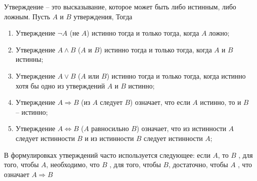     Утверждение -- это высказывание, которое может быть 
    либо истинным, либо ложным. Пусть $A$ и $B$ утверждения, Тогда

    \begin{enumerate}
        \item Утверждение $\lnot A$ (не $A$) истинно тогда и 
        только тогда, когда $A$ ложно;
        \item Утверждение $A \land B$ ($A$ и $B$) истинно 
        тогда и только тогда, когда $A$ и $B$ истинны;
        \item Утверждение $A \lor B$ ($A$ или $B$) истинно 
        тогда и только тогда, когда истинно хотя бы одно из утверждений
        $A$ и $B$ истинно;
        \item Утверждение $A \Rightarrow B$ (из $A$ следует $B$) означает,
        что если $A$ истинно, то и $B$ -- истинно;
        \item Утверждение $A \Leftrightarrow B$ ($A$ равносильно $B$) означает,
        что из истинности $A$ следует истинности $B$ и из истинности $B$
        следует истинности $A$;
    \end{enumerate}

    В формулировках утверждений часто используется следующее: \glqq если $A$, то $B$ \grqq,
    \glqq для того, чтобы $A$, необходимо, что $B$ \grqq, \glqq для того, чтобы $B$,
    достаточно, чтобы $A$ \grqq, что означает $A \Rightarrow B$



